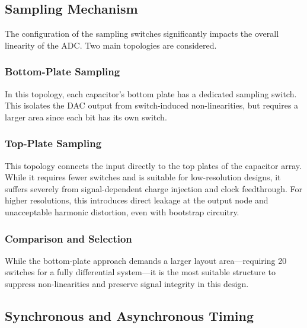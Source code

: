 \subsection{Sampling Mechanism}


The configuration of the sampling switches significantly impacts the overall linearity of the
ADC. Two main topologies are considered.

\subsubsection{Bottom-Plate Sampling}

In this topology, each capacitor's bottom plate has a dedicated sampling switch. This isolates
the DAC output from switch-induced non-linearities, but requires a larger area since each bit
has its own switch.

\subsubsection{Top-Plate Sampling}

This topology connects the input directly to the top plates of the capacitor array. While it
requires fewer switches and is suitable for low-resolution designs, it suffers severely from
signal-dependent charge injection and clock feedthrough. For higher resolutions, this introduces
direct leakage at the output node and unacceptable harmonic distortion, even with bootstrap
circuitry.

\subsubsection{Comparison and Selection}

While the bottom-plate approach demands a larger layout area---requiring 20 switches for a
fully differential system---it is the most suitable structure to suppress non-linearities and
preserve signal integrity in this design.

\subsection{Synchronous and Asynchronous Timing}


